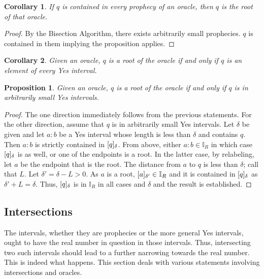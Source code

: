 \documentclass[12pt]{article}
\newtheorem{corollary}{Corollary}[section]
\newtheorem{proposition}{Proposition}[section]
\begin{document}
\begin{corollary}\label{os:root}
    If $q$ is contained in every prophecy of an oracle, then $q$ is the root of that oracle. 
\end{corollary}

\begin{proof}
    By the Bisection Algorithm, there exists arbitrarily small prophecies. $q$ is contained in them implying the proposition applies. 
\end{proof}



\begin{corollary}
    Given an oracle, $q$ is a root of the oracle if and only if $q$ is an element of every Yes interval. 
\end{corollary}

\begin{proposition}
    Given an oracle, $q$ is a root of the oracle if and only if $q$ is in arbitrarily small Yes intervals. 
\end{proposition}

\begin{proof}
   The one direction immediately follows from the previous statements. For the other direction, assume that $q$ is in arbitrarily small Yes intervals. Let $\delta$ be given and let $a:b$ be a Yes interval whose length is less than $\delta$ and contains $q$. Then $a:b$ is strictly contained in $\halo{q}$. From above, either $a:b \in \mathbb{I}_R$ in which case $\halo{q}$ is as well, or one of the endpoints is a root. In the latter case, by relabeling, let $a$ be the endpoint that is the root. The distance from $a$ to $q$ is less than $\delta$; call that $L$. Let $\delta' = \delta - L > 0$. As $a$ is a root, $\halo[\delta']{a} \in \mathbb{I}_R$ and it is contained in $\halo{q}$ as $\delta' + L = \delta$. Thus, $\halo{q}$ is in $\mathbb{I}_R$ in all cases and $\delta$ and the result is established. 
\end{proof}


\subsection{Intersections}

The intervals, whether they are prophecies or the more general Yes intervals, ought to have the real number in question in those intervals. Thus, intersecting two such intervals should lead to a further narrowing towards the real number. This is indeed what happens. This section deals with various statements involving intersections and oracles. 
\end{document}
